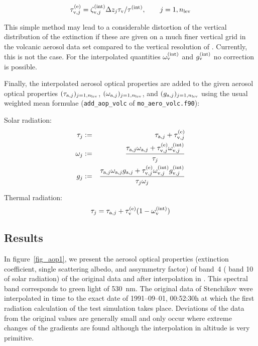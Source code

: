 \begin{appendix}
\begin{displaymath}
\tau^{(\rm e)}_{{\rm v},j}=\zeta^{(\rm int)}_{{\rm v},j}\Delta
z_j\tau_{\rm v}/\tau^{(\rm int)}, \qquad j=1,n_{\rm lev}
\end{displaymath}

This simple method may lead to a considerable distortion of the
vertical distribution of the extinction if these are given on a much
finer vertical grid in the volcanic aerosol data set compared to the
vertical resolution of \echam. Currently, this is not the case.
For the interpolated quantities $\omega^{(\rm int)}_{\rm v}$ and
$g^{(\rm int)}_{\rm v}$ no correction is possible.

Finally, the interpolated aerosol optical properties are added to the
given aerosol optical properties $(\tau_{{\rm a},j})_{j=1,n_{\rm lev}}$,
$(\omega_{{\rm a},j})_{j=1,n_{\rm lev}}$, and $(g_{{\rm
  a},j})_{j=1,n_{\rm lev}}$ using the usual weighted mean formulae
({\tt add\_aop\_volc} of {\tt mo\_aero\_volc.f90}):

Solar radiation:
\begin{eqnarray*}
\tau_j&:=&\tau_{{\rm a},j}+\tau^{(\rm e)}_{{\rm v},j}\\
\omega_j&:=&\frac{\tau_{{\rm a},j}\omega_{{\rm a},j}+\tau^{(\rm e)}_{{\rm
  v},j}\omega^{(\rm int)}_{{\rm v},j}}{\tau_j}\\ 
g_j&:=&\frac{\tau_{{\rm a},j}\omega_{{\rm a},j}g_{{\rm a},j}+\tau^{(\rm e)}_{{\rm
  v},j}\omega^{(\rm int)}_{{\rm v},j}g^{(\rm int)}_{{\rm v},j}}{\tau_j\omega_j}\\
\end{eqnarray*}

Thermal radiation:
\begin{displaymath}
\tau_j=\tau_{{\rm a},j}+\tau^{(\rm e)}_{\rm v}(1-\omega^{(\rm int)}_{\rm v})
\end{displaymath}

\subsection{Results}

In figure~\ref{fig_aop1}, we present the aerosol
optical properties (extinction coefficient, single scattering albedo,
and assymmetry factor) of 
band~4 (\echam{} band 10 of solar radiation) of the original data and
after interpolation in \echam. This spectral band corresponds to green
light of 530~nm. The original data of Stenchikov were interpolated in time to
the exact date of 1991--09--01, 00:52:30h at which the first radiation
calculation of the test simulation takes place. Deviations of the
\echam{} data from the original values are generally small and only occur
where extreme changes of the gradients are found although the
interpolation in altitude is very primitive. 


\end{appendix}
